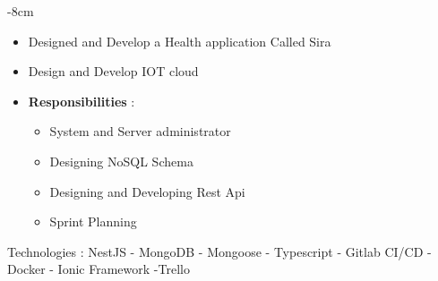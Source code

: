 \documentclass[10pt,a4paper]{altacv}
\begin{document}

\begin{adjustwidth}{}{-8cm}
\makecvheader
\end{adjustwidth}


\begin{itemize}
\item Designed and Develop a Health application Called Sira
\item Design and Develop IOT cloud
\item \textbf{Responsibilities} :
\begin{itemize}
    \item System and Server administrator
    \item Designing NoSQL Schema
    \item Designing and Developing Rest Api 
    				\item Sprint Planning

\end{itemize}
\end{itemize}
				\item Technologies : 
               {NestJS - MongoDB - Mongoose - Typescript - Gitlab CI/CD - Docker - Ionic Framework -Trello}
\divider
\end{document}
